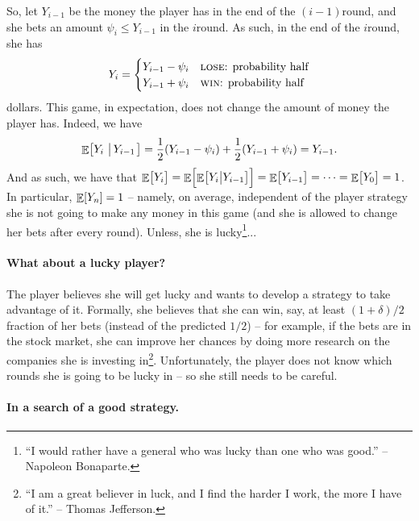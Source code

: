 So, let $Y_{i-1}$ be the money the player has in the end of the
$(i-1)$\th round, and she bets an amount $\psi_i \leq Y_{i-1}$ in the
$i$\th round.  As such, in the end of the $i$\th round, she has
\begin{align*}
    Y_{i} = \begin{cases}
        Y_{i-1} - \psi_{i} & \text{\textsc{lose}: probability half}\\
        Y_{i-1} + \psi_i & \text{\textsc{win}: probability half}
    \end{cases}
\end{align*}
dollars.  This game, in expectation, does not change the amount of
money the player has. Indeed, we have
\begin{align*}
    \Ex{Y_i\sep{Y_{i-1}}}%
    =%
    \frac{1}{2}\pth{ Y_{i-1} - \psi_i} + \frac{1}{2}\pth{Y_{i-1} +
       \psi_i}%
    =%
    Y_{i-1}.
\end{align*}
And as such, we have that
$\mathop{\mathbb{E}}\!\left[ {\bigl. Y_i} \right] = \mathop{\mathbb{E}}\!\left[ {\mathop{\mathbb{E}}\!\left[ {Y_{i}\bigl| {Y_{i-1}} } \right] \Bigl.\! } \right] = \mathop{\mathbb{E}}\!\left[ {
   \bigl. Y_{i-1}} \right] = \cdots = \mathop{\mathbb{E}}\!\left[ {Y_0 \bigl.} \right] = 1\Big.$. In
particular, $\mathop{\mathbb{E}}\!\left[ {Y_n} \right] = 1$ -- namely, on average, independent of the
player strategy she is not going to make any money in this game (and
she is allowed to change her bets after every round). Unless, she is
lucky\footnote{``I would rather have a general who was lucky than one
   who was good.'' -- Napoleon Bonaparte.}...




\paragraph*{What about a lucky player?}

The player believes she will get lucky and wants to develop a strategy
to take advantage of it.  Formally, she believes that she can win,
say, at least $(1+\delta)/2$ fraction of her bets (instead of the
predicted $1/2$) -- for example, if the bets are in the stock market,
she can improve her chances by doing more research on the companies
she is investing in\footnote{``I am a great believer in luck, and I
   find the harder I work, the more I have of it.'' -- Thomas
   Jefferson.}. Unfortunately, the player does not know which rounds
she is going to be lucky in -- so she still needs to be careful.


\paragraph*{In a search of a good strategy.}


